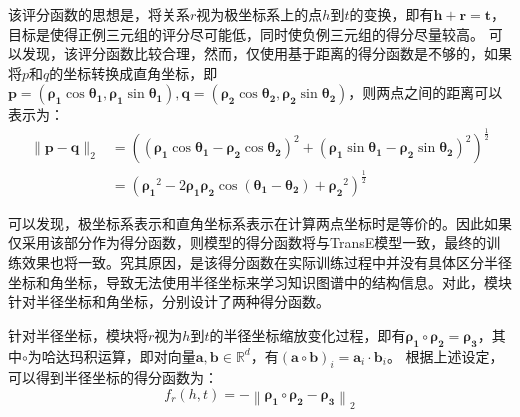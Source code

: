 \documentclass[algorithmlist, AutoFakeBold, AutoFakeSlant, figurelist, tablelist, nomlist, masters]{seuthesix}
\begin{document}
该评分函数的思想是，将关系$r$视为极坐标系上的点$h$到$t$的变换，即有$\bm{h} + \bm{r} = \bm{t}$，目标是使得正例三元组的评分尽可能低，同时使负例三元组的得分尽量较高。
可以发现，该评分函数比较合理，然而，仅使用基于距离的得分函数是不够的，如果将$p$和$q$的坐标转换成直角坐标，即$\bm{p}=\left(\bm{\rho_1} \cos \bm{\theta_1}, \bm{\rho_1} \sin \bm{\theta_1}\right), \bm{q}=\left(\bm{\rho_2} \cos \bm{\theta_2}, \bm{\rho_2} \sin \bm{\theta_2}\right)$，则两点之间的距离可以表示为：
\begin{equation}
  \begin{aligned}
  \|\bm{p}-\bm{q}\|_2 & =\left(\left(\bm{\rho_1} \cos \bm{\theta_1}-\bm{\rho_2} \cos \bm{\theta_2}\right)^2+\left(\bm{\rho_1} \sin \bm{\theta_1}-\bm{\rho_2} \sin \bm{\theta_2}\right)^2\right)^{\frac{1}{2}} \\
  & =\left(\bm{\rho_1}^2-2 \bm{\rho_1} \bm{\rho_2} \cos \left(\bm{\theta_1}-\bm{\theta_2}\right)+\bm{\rho_2}^2\right)^{\frac{1}{2}}
  \end{aligned}
\end{equation}

可以发现，极坐标系表示和直角坐标系表示在计算两点坐标时是等价的。因此如果仅采用该部分作为得分函数，则模型的得分函数将与TransE模型一致，最终的训练效果也将一致。究其原因，是该得分函数在实际训练过程中并没有具体区分半径坐标和角坐标，导致无法使用半径坐标来学习知识图谱中的结构信息。对此，模块针对半径坐标和角坐标，分别设计了两种得分函数。

针对半径坐标，模块将$r$视为$h$到$t$的半径坐标缩放变化过程，即有$\bm{\rho_1} \circ \bm{\rho_2} = \bm{\rho_3}$，其中$\circ$为哈达玛积运算，即对向量$\bm{a}, \bm{b} \in \mathbb{R}^{d}$，有$\left(\mathbf{a} \circ \mathbf{b}\right)_i = \mathbf{a}_i \cdot \mathbf{b}_i$。
根据上述设定，可以得到半径坐标的得分函数为：
\begin{equation}
  f_r\left(h, t\right) =-\left\|\bm{\rho_1} \circ \bm{\rho_2} - \bm{\rho_3}\right\|_2
\end{equation}
\end{document}
